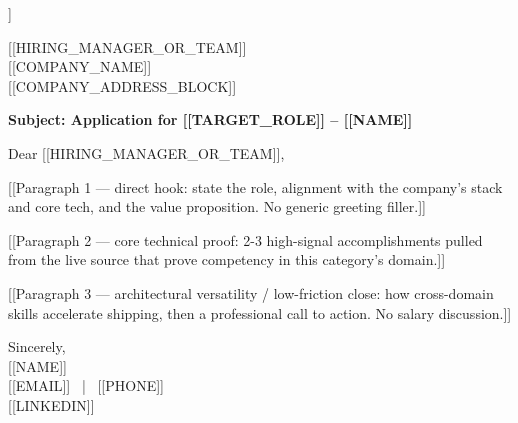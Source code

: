 \documentclass[11pt]{article}
\begin{document}
\begin{flushright}
[[DATE]]
\end{flushright}

[[HIRING\_MANAGER\_OR\_TEAM]] \\{}
[[COMPANY\_NAME]] \\{}
[[COMPANY\_ADDRESS\_BLOCK]]

\textbf{Subject: Application for [[TARGET\_ROLE]] -- [[NAME]]}

Dear [[HIRING\_MANAGER\_OR\_TEAM]],

[[Paragraph 1 — direct hook: state the role, alignment with the company's stack and core tech, and the
value proposition. No generic greeting filler.]]

[[Paragraph 2 — core technical proof: 2-3 high-signal accomplishments pulled from the live source that
prove competency in this category's domain.]]

[[Paragraph 3 — architectural versatility / low-friction close: how cross-domain skills accelerate
shipping, then a professional call to action. No salary discussion.]]

Sincerely, \\{}
[[NAME]] \\{}
[[EMAIL]] \ | \ [[PHONE]] \\{}
[[LINKEDIN]]
\end{document}
